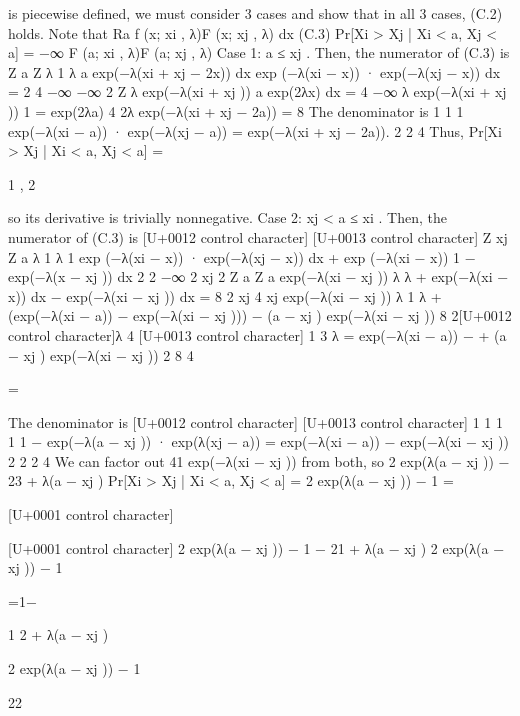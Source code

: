 \documentclass[10pt]{article}
\begin{document}
\begin{ReviewVerbatim}
is piecewise defined, we must consider 3 cases and show that in all 3 cases, (C.2) holds. Note that
Ra
f (x; xi , λ)F (x; xj , λ) dx
(C.3)
Pr[Xi > Xj | Xi < a, Xj < a] = −∞
F (a; xi , λ)F (a; xj , λ)
Case 1: a ≤ xj .
Then, the numerator of (C.3) is
Z a
Z
λ
1
λ a
exp(−λ(xi + xj − 2x)) dx
exp (−λ(xi − x)) · exp(−λ(xj − x)) dx =
2
4 −∞
−∞ 2
Z
λ exp(−λ(xi + xj )) a
exp(2λx) dx
=
4
−∞
λ exp(−λ(xi + xj )) 1
=
exp(2λa)
4
2λ
exp(−λ(xi + xj − 2a))
=
8
The denominator is
1
1
1
exp(−λ(xi − a)) · exp(−λ(xj − a)) = exp(−λ(xi + xj − 2a)).
2
2
4
Thus,
Pr[Xi > Xj | Xi < a, Xj < a] =

1
,
2

so its derivative is trivially nonnegative.
Case 2: xj < a ≤ xi .
Then, the numerator of (C.3) is
[U+0012 control character]
[U+0013 control character]
Z xj
Z a
λ
1
λ
1
exp (−λ(xi − x)) · exp(−λ(xj − x)) dx +
exp (−λ(xi − x)) 1 − exp(−λ(x − xj )) dx
2
2
−∞ 2
xj 2
Z a
Z a
exp(−λ(xi − xj )) λ
λ
+
exp(−λ(xi − x)) dx −
exp(−λ(xi − xj )) dx
=
8
2 xj
4 xj
exp(−λ(xi − xj )) λ 1
λ
+
(exp(−λ(xi − a)) − exp(−λ(xi − xj ))) − (a − xj ) exp(−λ(xi − xj ))
8
2[U+0012 control character]λ
4
[U+0013 control character]
1
3 λ
= exp(−λ(xi − a)) −
+ (a − xj ) exp(−λ(xi − xj ))
2
8
4

=

The denominator is
[U+0012 control character]
[U+0013 control character]
1
1
1
1
1 − exp(−λ(a − xj )) · exp(λ(xj − a)) = exp(−λ(xi − a)) − exp(−λ(xi − xj ))
2
2
2
4
We can factor out 41 exp(−λ(xi − xj )) from both, so
2 exp(λ(a − xj )) − 23 + λ(a − xj )
Pr[Xi > Xj | Xi < a, Xj < a] =
2 exp(λ(a − xj )) − 1
=

[U+0001 control character]

[U+0001 control character]
2 exp(λ(a − xj )) − 1 − 21 + λ(a − xj )
2 exp(λ(a − xj )) − 1

=1−

1
2 + λ(a − xj )

2 exp(λ(a − xj )) − 1

22



\end{ReviewVerbatim}
\end{document}
